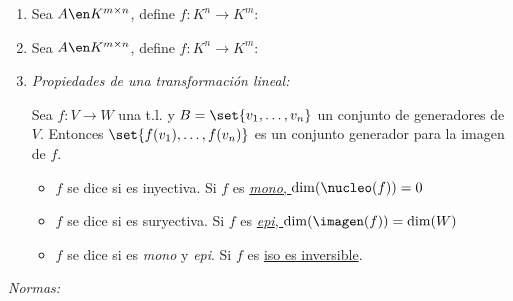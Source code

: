 \begin{enumerate}[label=\tiny\purple{\faIcon{snowman}}]
  \item Sea $A \en K^{m \times n}$, define $f: K^n \to K^m$:

  \item Sea $A \en K^{m \times n}$, define $f: K^n \to K^m$:

  \item \textit{Propiedades de una transformación lineal:}

        Sea $f: V \to W$ una t.l. y $B = \set{v_1, \ldots, v_n}$ un conjunto
        de generadores de $V$. Entonces $\set{f(v_1),\ldots, f(v_n) }$ es un conjunto
        generador para la imagen de $f$.

        \begin{itemize}
          \item $f$ se dice  si es inyectiva. Si $f$ es \ul{\textit{mono}, $\dim(\nucleo(f)) = 0$}
          \item $f$ se dice  si es suryectiva. Si $f$ es \ul{\textit{epi}, $\dim(\imagen(f)) = \dim(W)$}
          \item $f$ se dice  si es \textit{mono} y \textit{epi}. Si $f$ es \ul{iso es inversible}.
        \end{itemize}
\end{enumerate}

\bigskip

\hypertarget{teoria-2:normas}{\textit{Normas:}}

